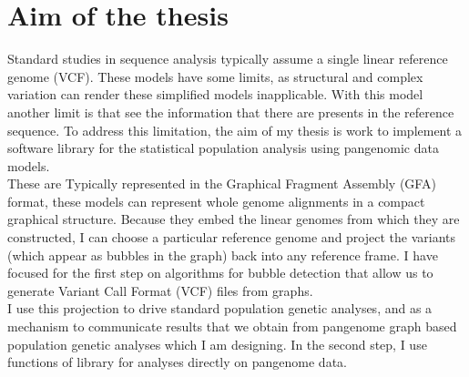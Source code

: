 
\chapter{Aim of the thesis} %

\label{Chapter4} %




Standard studies in sequence analysis typically assume a single linear reference genome (VCF). 
These models have some limits, as structural and complex variation can render these simplified models inapplicable. With this model another limit is that see the information that there are presents in the reference sequence. To address this limitation, the aim of my thesis is work to implement a software library for the statistical population analysis using pangenomic data models.\\ 

These are Typically represented in the Graphical Fragment Assembly (GFA) format, these models can represent whole genome alignments in a compact graphical structure. Because they embed the linear genomes from which they are constructed, I can choose a particular reference genome and project the variants (which appear as bubbles in the graph) back into any reference frame. I have focused for the first step on algorithms for bubble detection that allow us to generate Variant Call Format (VCF) files from graphs.\\

I use this projection to drive standard population genetic analyses, and as a mechanism to communicate results that we obtain from pangenome graph based population genetic analyses which I am designing.
In the second step, I use functions of library for analyses directly on pangenome data.


